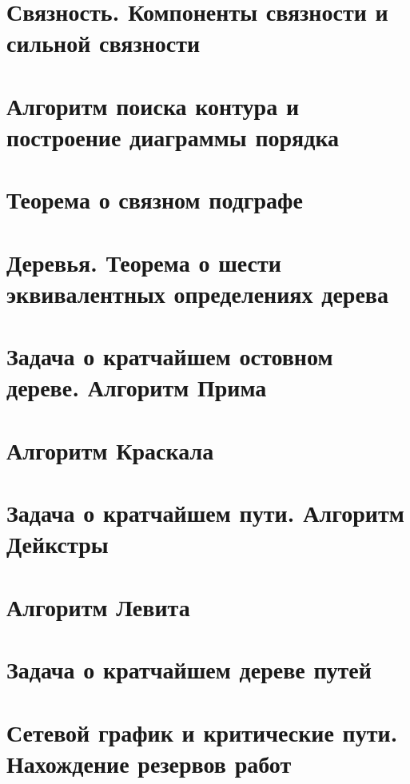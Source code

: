 \documentclass[12pt, fleqn]{article}
\begin{document}
\section{Связность. Компоненты связности и сильной связности}
\newpage

\section{Алгоритм поиска контура и построение диаграммы порядка}
\newpage

\section{Теорема о связном подграфе}


\newpage

\section{Деревья. Теорема о шести эквивалентных определениях дерева}

\newpage

\section{Задача о кратчайшем остовном дереве. Алгоритм Прима}
\newpage

\section{Алгоритм Краскала}
\newpage

\section{Задача о кратчайшем пути. Алгоритм Дейкстры}
\newpage

\section{Алгоритм Левита}

\newpage

\section{Задача о кратчайшем дереве путей}

\newpage

\section{Сетевой график и критические пути. Нахождение резервов работ}
\newpage
\end{document}
